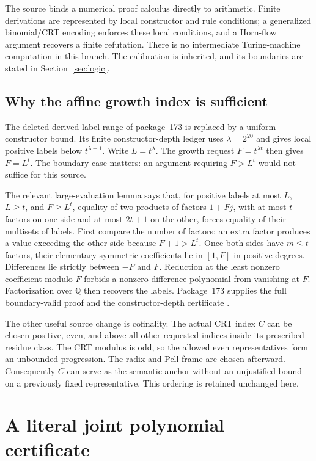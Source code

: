 \documentclass[11pt]{article}
\theoremstyle{definition}\newtheorem{definition}[theorem]{Definition}
\theoremstyle{remark}\newtheorem{remark}[theorem]{Remark}
\begin{document}
The source binds a numerical proof calculus directly to arithmetic.
Finite derivations are represented by local constructor and rule
conditions; a generalized binomial/CRT encoding enforces these local
conditions, and a Horn-flow argument recovers a finite refutation.
There is no intermediate Turing-machine computation in this branch.
The calibration is inherited, and its boundaries are stated in
Section~\ref{sec:logic}.

\subsection{Why the affine growth index is sufficient}
The deleted derived-label range of package~173 is replaced by a uniform
constructor bound. Its finite constructor-depth ledger uses
$\lambda=2^{20}$ and gives local positive labels below $t^{\lambda-1}$.
Write $L=t^{\lambda}$. The growth request $F=t^{\lambda t}$ then gives
$F=L^t$. The boundary case matters: an argument requiring $F>L^t$
would not suffice for this source.

The relevant large-evaluation lemma says that, for positive labels at
most $L$, $L\geq t$, and $F\geq L^t$, equality of two products of factors
$1+Fj$, with at most $t$ factors on one side and at most $2t+1$ on the
other, forces equality of their multisets of labels. First compare the
number of factors: an extra factor produces a value exceeding the
other side because $F+1>L^t$. Once both sides have $m\leq t$ factors,
their elementary symmetric coefficients lie in $[1,F]$ in positive
degrees. Differences lie strictly between $-F$ and $F$. Reduction at
the least nonzero coefficient modulo $F$ forbids a nonzero difference
polynomial from vanishing at $F$. Factorization over $\mathbb Q$ then
recovers the labels. Package~173 supplies the full boundary-valid
proof and the constructor-depth certificate \cite{p173}.

The other useful source change is cofinality. The actual CRT index $C$
can be chosen positive, even, and above all other requested indices
inside its prescribed residue class. The CRT modulus is odd, so the
allowed even representatives form an unbounded progression. The radix
and Pell frame are chosen afterward. Consequently $C$ can serve as the
semantic anchor without an unjustified bound on a previously fixed
representative. This ordering is retained unchanged here.

\section{A literal joint polynomial certificate}
\label{sec:literal}
\end{document}
